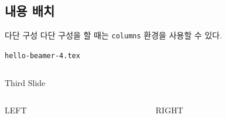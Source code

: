 \documentclass[compress]{beamer}
\begin{document}
\subsection{내용 배치}
\begin{frame}[fragile=singleslide]{다단 구성}
  다단 구성을 할 때는 \verb/columns/ 환경을 사용할 수 있다.
  \begin{block}{\texttt{hello-beamer-4.tex}}
    \begin{columns}
      \begin{column}{0.61\textwidth}
        \begin{latexcode}
          \begin{frame}{Third Slide}
            \begin{columns}
              \begin{column}{0.5\textwidth}
                \LARGE LEFT
              \end{column}
              \begin{column}{0.5\textwidth}
                \LARGE RIGHT
              \end{column}
            \end{columns}
          \end{frame}
        \end{latexcode}
      \end{column}
    \end{columns}
  \end{block}
\end{frame}
\end{document}
